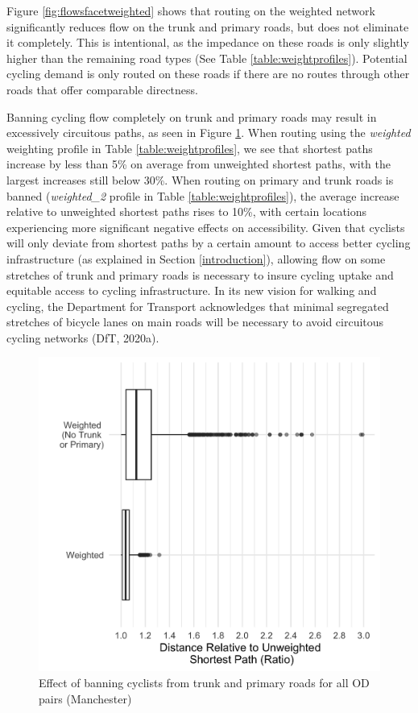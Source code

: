 \documentclass[
]{article}
\begin{document}
Figure \ref{fig:flowsfacetweighted} shows that routing on the weighted network significantly reduces flow on the trunk and primary roads, but does not eliminate it completely.
This is intentional, as the impedance on these roads is only slightly higher than the remaining road types (See Table \ref{table:weightprofiles}).
Potential cycling demand is only routed on these roads if there are no routes through other roads that offer comparable directness.

Banning cycling flow completely on trunk and primary roads may result in excessively circuitous paths, as seen in Figure \ref{fig:boxplotcircuity}.
When routing using the \emph{weighted} weighting profile in Table \ref{table:weightprofiles}, we see that shortest paths increase by less than 5\% on average from unweighted shortest paths, with the largest increases still below 30\%.
When routing on primary and trunk roads is banned (\emph{weighted\_2} profile in Table \ref{table:weightprofiles}), the average increase relative to unweighted shortest paths rises to 10\%, with certain locations experiencing more significant negative effects on accessibility.
Given that cyclists will only deviate from shortest paths by a certain amount to access better cycling infrastructure (as explained in Section \ref{introduction}), allowing flow on some stretches of trunk and primary roads is necessary to insure cycling uptake and equitable access to cycling infrastructure.
In its new vision for walking and cycling, the Department for Transport acknowledges that minimal segregated stretches of bicycle lanes on main roads will be necessary to avoid circuitous cycling networks (DfT, 2020a).

\begin{figure}

{\centering \includegraphics[width=0.5\linewidth]{data/Manchester/Plots/boxplot_weighted_unweighted_distances} 

}

\caption{Effect of banning cyclists from trunk and primary roads for all OD pairs (Manchester)}\label{fig:boxplotcircuity}
\end{figure}
\end{document}
